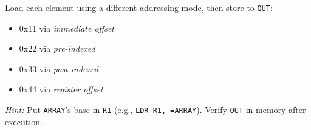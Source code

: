 Load each element using a different addressing mode, then store to \texttt{OUT}:
\begin{itemize}[nosep]
    \item 0x11 via \emph{immediate offset}
    \item 0x22 via \emph{pre-indexed}       
    \item 0x33 via \emph{post-indexed}       
    \item 0x44 via \emph{register offset}   
\end{itemize}
\emph{Hint:} Put \texttt{ARRAY}'s base in \texttt{R1} (e.g., \texttt{LDR R1, =ARRAY}). Verify \texttt{OUT} in memory after execution.
